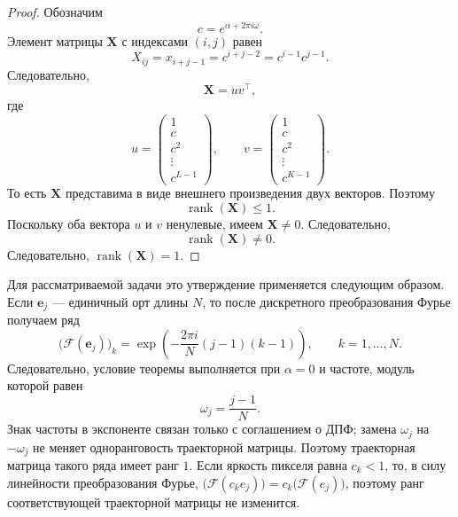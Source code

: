 \begin{proof} Обозначим
\[
c=e^{\alpha+2\pi i\omega}.
\]
Элемент матрицы $\mathbf{X}$ с индексами $(i,j)$ равен
\[
X_{ij}=x_{i+j-1}=c^{i+j-2} = c^{i-1} c^{j-1}.
\]
Следовательно,
\[
\mathbf{X}=uv^{\top},
\]
где
\[
u=
\begin{pmatrix}
1\\ c\\ c^2\\ \vdots\\ c^{L-1}
\end{pmatrix},
\qquad
v=
\begin{pmatrix}
1\\ c\\ c^2\\ \vdots\\ c^{K-1}
\end{pmatrix}.
\]
То есть $\mathbf{X}$ представима в виде внешнего произведения двух векторов. Поэтому
\[
\operatorname{rank}(\mathbf{X}) \le 1.
\]
Поскольку оба вектора $u$ и $v$ ненулевые, имеем $\mathbf{X}\neq 0$. Следовательно,
\[
\operatorname{rank}(\mathbf{X})\neq 0.
\]
Следовательно,
\(
\operatorname{rank}(\mathbf{X})=1.
\)
\end{proof}

Для рассматриваемой задачи это утверждение применяется следующим образом. Если $\mathbf{e}_j$ --- единичный орт длины $N$, то после дискретного преобразования Фурье получаем ряд
\[
\bigl(\mathcal{F}(\mathbf{e}_j)\bigr)_k
=
\exp\!\left(
-\frac{2\pi i}{N}(j-1)(k-1)
\right),
\qquad k=1,\dots,N.
\]
Следовательно, условие теоремы выполняется при $\alpha=0$ и частоте, модуль
которой равен
\[
\omega_j = \frac{j-1}{N}.
\]
Знак частоты в экспоненте связан только с соглашением о ДПФ; замена
$\omega_j$ на $-\omega_j$ не меняет одноранговость траекторной матрицы.
Поэтому траекторная матрица такого ряда имеет ранг $1$. Если яркость пикселя равна $c_k < 1$, то, в силу линейности преобразования Фурье,  $\bigl(\mathcal{F}(c_ke_j)\bigr) = c_k\bigl(\mathcal{F}(e_j)\bigr)$, поэтому ранг соответствующей траекторной матрицы не изменится.

